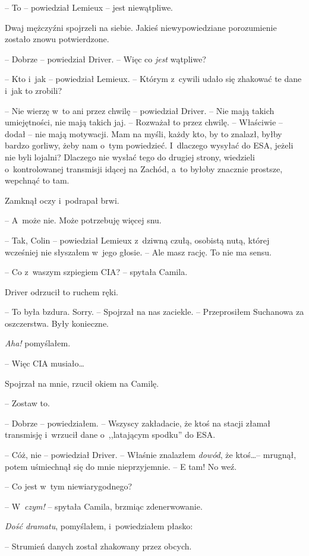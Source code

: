 \documentclass[oneside,polish,12pt,sfheadings]{mwbk}
\begin{document}
-- To -- powiedział Lemieux -- jest niewątpliwe.

Dwaj mężczyźni spojrzeli na siebie. Jakieś niewypowiedziane porozumienie
zostało znowu potwierdzone.

-- Dobrze -- powiedział Driver. -- Więc co \emph{ jest} wątpliwe?

-- Kto i~jak -- powiedział Lemieux. -- Którym z~cywili udało się zhakować
te dane i~jak to zrobili?

-- Nie wierzę w~to ani przez chwilę -- powiedział Driver. -- Nie mają
takich umiejętności, nie mają takich jaj. -- Rozważał to przez chwilę. --
Właściwie -- dodał -- nie mają motywacji. Mam na myśli, każdy kto, by to
znalazł, byłby bardzo gorliwy, żeby nam o~tym powiedzieć. I~dlaczego
wysyłać do ESA, jeżeli nie byli lojalni? Dlaczego nie wysłać tego do
drugiej strony, wiedzieli o~kontrolowanej transmisji idącej na Zachód, a~to byłoby znacznie prostsze, wepchnąć to tam.

Zamknął oczy i~podrapał brwi. 

-- A~może nie. Może potrzebuję więcej snu.

-- Tak, Colin -- powiedział Lemieux z~dziwną czułą, osobistą nutą, której
wcześniej nie słyszałem w~jego głosie. -- Ale masz rację. To nie ma
sensu.

-- Co z~waszym szpiegiem CIA? -- spytała Camila.

Driver odrzucił to ruchem ręki.

-- To była bzdura. Sorry. -- Spojrzał na nas zaciekle. -- Przeprosiłem
Suchanowa za oszczerstwa. Były konieczne.

\emph{ Aha! } pomyślałem. 

-- Więc CIA musiało\ldots

Spojrzał na mnie, rzucił okiem na Camilę. 

-- Zostaw to.

-- Dobrze -- powiedziałem. -- Wszyscy zakładacie, że ktoś na stacji złamał
transmisję i~wrzucił dane o~,,latającym spodku'' do ESA.

-- Cóż, nie -- powiedział Driver. -- Właśnie znalazłem \emph{ dowód}, że
ktoś\ldots -- mrugnął, potem uśmiechnął się do mnie nieprzyjemnie. -- E tam!
No weź.

-- Co jest w~tym niewiarygodnego?

-- W~\emph{czym!} -- spytała Camila, brzmiąc zdenerwowanie.

\emph{Dość dramatu}, pomyślałem, i~powiedziałem płasko: 

-- Strumień
danych został zhakowany przez obcych.
\end{document}

